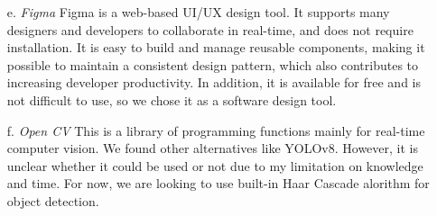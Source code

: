 \documentclass[conference]{IEEEtran}
\begin{document}
\begin{itemize}
\item[e.]{\emph{Figma}}
   \newline
   Figma is a web-based UI/UX design tool. It supports many designers and developers to collaborate in real-time, and does not require installation. It is easy to build and manage reusable components, making it possible to maintain a consistent design pattern, which also contributes to increasing developer productivity. In addition, it is available for free and is not difficult to use, so we chose it as a software design tool.
    \\ \end{itemize}
\begin{itemize}
\item[f.]{\emph{Open CV}}
   \newline
   This is a library of programming functions mainly for real-time computer vision. We found other alternatives like YOLOv8. However, it is unclear whether it could be used or not due to my limitation on knowledge and time. For now, we are looking to use built-in Haar Cascade alorithm for object detection.
    \\ \end{itemize}
    
\newpage
\end{document}
